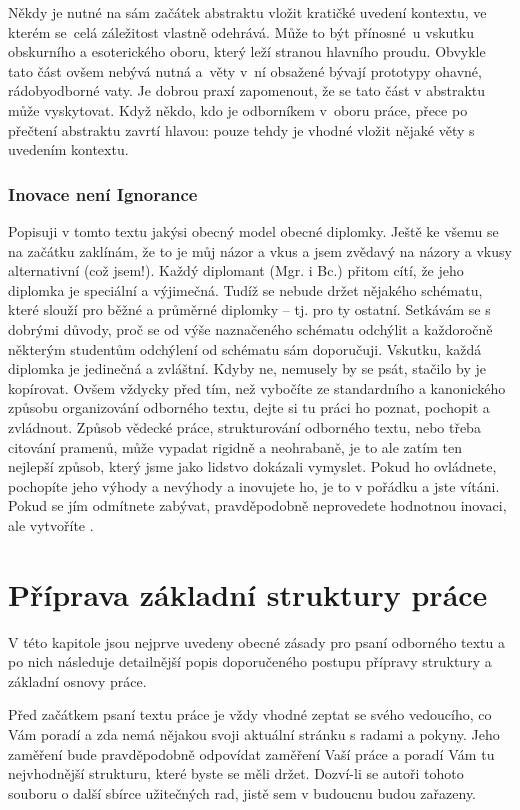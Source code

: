 Někdy je nutné na sám začátek abstraktu vložit kratičké uvedení kontextu, ve kterém se~celá záležitost vlastně odehrává. Může to být přínosné~u vskutku obskurního a esoterického oboru, který leží stranou hlavního proudu. Obvykle tato část ovšem nebývá nutná a~věty v~ní obsažené bývají prototypy ohavné, rádobyodborné vaty. Je dobrou praxí zapomenout, že se tato část v abstraktu může vyskytovat. Když někdo, kdo je odborníkem v~oboru práce, přece po přečtení abstraktu zavrtí hlavou:  pouze tehdy je vhodné vložit nějaké věty s uvedením kontextu.

\subsection*{Inovace není Ignorance}

Popisuji v tomto textu jakýsi obecný model obecné diplomky. Ještě ke všemu se na začátku zaklínám, že to je můj názor a vkus a jsem zvědavý na názory a vkusy alternativní (což jsem!). Každý diplomant (Mgr. i Bc.) přitom cítí, že jeho diplomka je speciální a výjimečná. Tudíž se nebude držet nějakého schématu, které slouží pro běžné a průměrné diplomky -- tj. pro ty ostatní. Setkávám se s dobrými důvody, proč se od výše naznačeného schématu odchýlit a každoročně některým studentům odchýlení od schématu sám doporučuji. Vskutku, každá diplomka je jedinečná a zvláštní. Kdyby ne, nemusely by se psát, stačilo by je kopírovat. Ovšem vždycky před tím, než vybočíte ze standardního a kanonického způsobu organizování odborného textu, dejte si tu práci ho poznat, pochopit a zvládnout. Způsob vědecké práce, strukturování odborného textu, nebo třeba citování pramenů, může vypadat rigidně a neohrabaně, je to ale zatím ten nejlepší způsob, který jsme jako lidstvo dokázali vymyslet. Pokud ho ovládnete, pochopíte jeho výhody a nevýhody a inovujete ho, je to v pořádku a jste vítáni. Pokud se jím odmítnete zabývat, pravděpodobně neprovedete hodnotnou inovaci, ale vytvoříte .


\chapter{Příprava základní struktury práce}
\label{struktura}

V této kapitole jsou nejprve uvedeny obecné zásady pro psaní odborného textu a po nich následuje detailnější popis doporučeného postupu přípravy struktury a základní osnovy práce.

Před začátkem psaní textu práce je vždy vhodné zeptat se svého vedoucího, co Vám poradí a zda nemá nějakou svoji aktuální stránku s radami a pokyny. Jeho zaměření bude pravděpodobně odpovídat zaměření Vaší práce a poradí Vám tu nejvhodnější strukturu, které byste se měli držet. Dozví-li se autoři tohoto souboru o další sbírce užitečných rad, jistě sem v budoucnu budou zařazeny.

